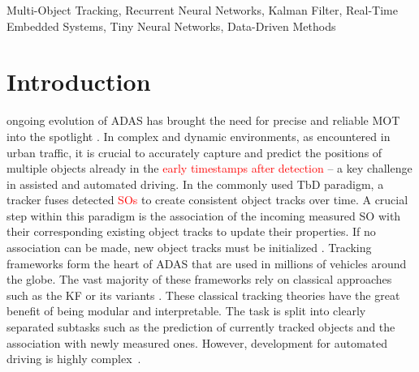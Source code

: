 \documentclass[letterpaper, 10 pt, journal, twoside]{IEEEtran}
\newcommand{\red}[1]{\textcolor{red}{#1}}
\begin{document}
\renewcommand{\IEEEkeywordsname}{Keywords}
\begin{IEEEkeywords}
\normalfont Multi-Object Tracking, Recurrent Neural Networks, Kalman Filter, Real-Time Embedded Systems, Tiny Neural Networks, Data-Driven Methods
\end{IEEEkeywords}

\section{Introduction}
ongoing evolution of \ac{ADAS} has brought the need for precise and reliable \ac{MOT} into the spotlight {\cite{KF_Bewley.2016,KF_simple_cues.2022,KF_BoundingBD.2023, DL_RNN_mot.2016,DL_RNN_data_association.2019,DL_CNN_ATT_mot.2017,DL_ATT_Trackformer.2022, DL_ATT_CNN_soda.2020, Zhang2021ByteTrackMT,Zhang2020FairMOTOT, liu2020deepmtt}}.
In complex and dynamic environments, as encountered in urban traffic, it is crucial to accurately capture and predict the positions of multiple objects already in the \red{early timestamps after detection} -- a key challenge in assisted and automated driving.
In the commonly used \ac{TbD} paradigm, a tracker fuses detected \red{\acp{SO}} to create consistent object tracks over time.
A crucial step within this paradigm is the association of the incoming measured \ac{SO} with their corresponding existing object tracks to update their properties.
If no association can be made, new object tracks must be initialized {\cite{KF_Bewley.2016,KF_simple_cues.2022,KF_BoundingBD.2023,OD_kampker.2018,OD_wu.2022}}.
Tracking frameworks form the heart of ADAS that are used in millions of vehicles around the globe.
The vast majority of these frameworks rely on classical approaches such as the \ac{KF} or its variants {\cite{KF_Bewley.2016,KF_simple_cues.2022,KF_BoundingBD.2023}}.
These classical tracking theories have the great benefit of being modular and interpretable.
The task is split into clearly separated subtasks such as the prediction of currently tracked objects and the association with newly measured ones.
However, development for automated driving is highly complex~{\cite{AD_Overview.2017,AD_book.2024}}.
\end{document}
